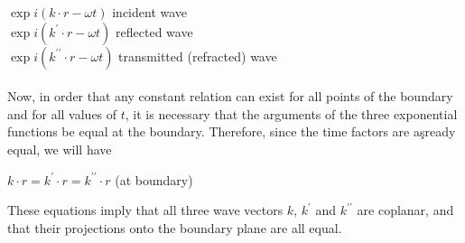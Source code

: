 \documentclass[a4paper,12pt]{report}
\begin{document}
$\exp i(k\cdot r-\omega t)$ incident wave\\
$\exp i(k^{\prime}\cdot r -\omega t)$ reflected wave\\
$\exp i(k^{\prime\prime}\cdot r - \omega t)$ transmitted (refracted) wave\\\\
Now, in order that any constant relation can exist for all points of the boundary and for all values of $t$, it is necessary that the arguments of the three exponential functions be equal at the boundary. Therefore, since the time factors are aşready equal, we will have
\begin{center}
	$k\cdot r=k^{\prime}\cdot r=k^{\prime\prime}\cdot r$ (at boundary)
\end{center}
These equations imply that all three wave vectors $k$, $k^{\prime}$ and $k^{\prime\prime}$ are coplanar, and that their projections onto the boundary plane are all equal. 
\end{document}
